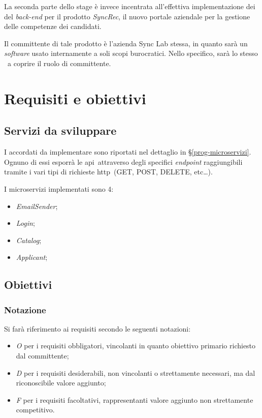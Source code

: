 La seconda parte dello stage è invece incentrata all'effettiva implementazione dei  del \textit{back-end} per il prodotto \textit{SyncRec}, il nuovo portale aziendale per la gestione delle competenze dei candidati.

Il committente di tale prodotto è l'azienda Sync Lab stessa, in quanto sarà un \textit{software} usato internamente a soli scopi burocratici.
Nello specifico, sarà lo stesso \fabio\ a coprire il ruolo di committente.

\section{Requisiti e obiettivi}

\subsection{Servizi  da sviluppare}

I  accordati da implementare sono riportati nel dettaglio in \S\ref{prog-microservizi}. Ognuno di essi esporrà le \gls{api}\gloss\ attraverso degli specifici \textit{endpoint}
raggiungibili tramite i vari tipi di richieste \acrshort{http}\gloss\ (GET, POST, DELETE, etc\dots).

I microservizi implementati sono 4:
\begin{itemize}
	\item \textit{EmailSender};
	\item \textit{Login};
	\item \textit{Catalog};
	\item \textit{Applicant};
\end{itemize}

\subsection{Obiettivi}\label{obiettivi-stage}

\subsubsection*{Notazione}
Si farà riferimento ai requisiti secondo le seguenti notazioni:
\begin{itemize}
	\item \textit{O} per i requisiti obbligatori, vincolanti in quanto obiettivo primario richiesto dal committente;
	\item \textit{D} per i requisiti desiderabili, non vincolanti o strettamente necessari,
	ma dal riconoscibile valore aggiunto;
	\item \textit{F} per i requisiti facoltativi, rappresentanti valore aggiunto non strettamente 
	competitivo.
\end{itemize}


